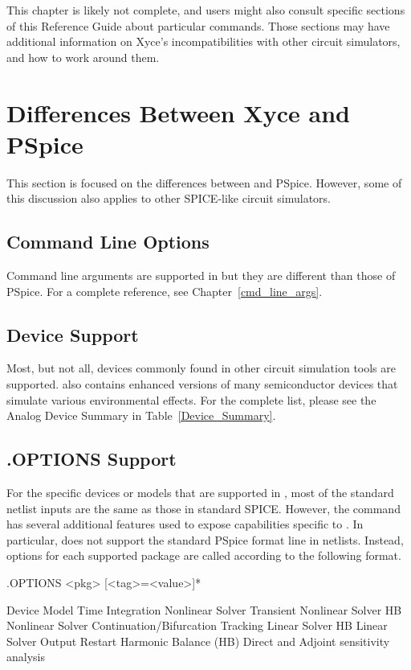 This chapter is likely not complete, and \Xyce{} users might also consult
specific sections of this Reference Guide about particular \Xyce{} commands.
Those sections may have additional information on Xyce's incompatibilities with
other circuit simulators, and how to work around them.  
\section{Differences Between Xyce and PSpice}
This section is focused on the differences between \Xyce{} and PSpice.
However, some of this discussion also applies to other SPICE-like
circuit simulators. 

\subsection{Command Line Options}
Command line arguments are supported in \Xyce{} but they are different than
those of PSpice.   For a complete reference, see Chapter~\ref{cmd_line_args}. 

\subsection{Device Support}
Most, but not all, devices commonly found in other
circuit simulation tools are supported.  \Xyce{} also contains enhanced versions of
many semiconductor devices that simulate various environmental effects.  For the
complete list, please see the
Analog Device Summary in Table~\ref{Device_Summary}.

\subsection{ .OPTIONS Support}
For the specific devices or models that are supported in \Xyce{}, most of the
standard netlist inputs are the same as those in standard SPICE.
However, the  command has several additional features used to
expose capabilities specific to \Xyce{}.  In particular, \Xyce{} does not
support the standard PSpice format  line in netlists.
Instead, options for each supported package are called according to the
following format.

\begin{Command}
\format
.OPTIONS <pkg> [<tag>=<value>]*

\arguments

\begin{Arguments}
       Device Model
      Time Integration
       Nonlinear Solver
  Transient Nonlinear Solver
    HB Nonlinear Solver
         Continuation/Bifurcation Tracking
       Linear Solver
    HB Linear Solver
       Output
      Restart
        Harmonic Balance (HB)
  Direct and Adjoint sensitivity analysis
\end{Arguments}

\end{Command}

